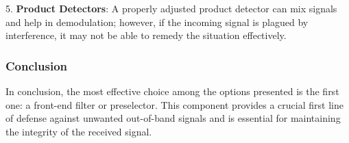 5. \textbf{Product Detectors}: A properly adjusted product detector can mix signals and help in demodulation; however, if the incoming signal is plagued by interference, it may not be able to remedy the situation effectively.

\subsubsection{Conclusion}
In conclusion, the most effective choice among the options presented is the first one: a front-end filter or preselector. This component provides a crucial first line of defense against unwanted out-of-band signals and is essential for maintaining the integrity of the received signal.


% 